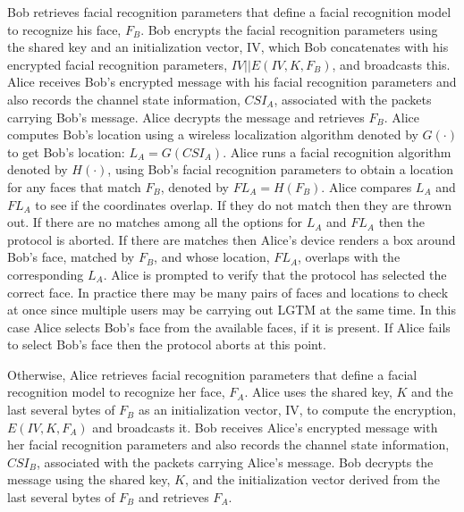 \documentclass[12pt]{report}
\begin{document}
Bob retrieves facial recognition parameters that define a facial recognition model to recognize his face, $F_{B}$. Bob encrypts the facial recognition parameters using the shared key and an initialization vector, IV, which Bob concatenates with his encrypted facial recognition parameters, $IV || E(IV, K, F_{B})$, and broadcasts this. Alice receives Bob's encrypted message with his facial recognition parameters and also records the channel state information, $CSI_{A}$, associated with the packets carrying Bob's message. Alice decrypts the message and retrieves $F_{B}$. Alice computes Bob's location using a wireless localization algorithm denoted by $G(\cdot)$ to get Bob's location: $L_{A} = G(CSI_{A})$. Alice runs a facial recognition algorithm denoted by $H(\cdot)$, using Bob's facial recognition parameters to obtain a location for any faces that match $F_{B}$, denoted by $FL_{A} = H(F_{B})$. Alice compares $L_{A}$ and $FL_{A}$ to see if the coordinates overlap. If they do not match then they are thrown out. If there are no matches among all the options for $L_{A}$ and $FL_{A}$ then the protocol is aborted. If there are matches then Alice's device renders a box around Bob's face, matched by $F_{B}$, and whose location, $FL_{A}$, overlaps with the corresponding $L_{A}$. Alice is prompted to verify that the protocol has selected the correct face. In practice there may be many pairs of faces and locations to check at once since multiple users may be carrying out LGTM at the same time. In this case Alice selects Bob's face from the available faces, if it is present. If Alice fails to select Bob's face then the protocol aborts at this point. \par

Otherwise, Alice retrieves facial recognition parameters that define a facial recognition model to recognize her face, $F_{A}$. Alice uses the shared key, $K$ and the last several bytes of $F_{B}$ as an initialization vector, IV, to compute the encryption, $E(IV, K, F_{A})$ and broadcasts it. Bob receives Alice's encrypted message with her facial recognition parameters and also records the channel state information, $CSI_{B}$, associated with the packets carrying Alice's message. Bob decrypts the message using the shared key, $K$, and the initialization vector derived from the last several bytes of $F_{B}$ and retrieves $F_{A}$. \par
\end{document}
